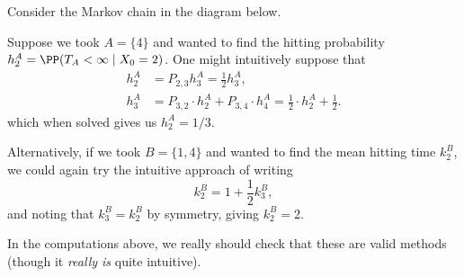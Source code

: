 \begin{example}
	Consider the Markov chain in the diagram below.
	\begin{center}
		\end{center}

		Suppose we took $A = \{4\}$ and wanted to find the hitting probability $h_2^A = \PP(T_A < \infty \mid X_0 = 2)$. One might intuitively suppose that
		\begin{align*}
			h_2^A &= P_{2, 3} h_3^A = \frac{1}{2} h_3^A, \\
			h_3^A &= P_{3, 2} \cdot h_2^A + P_{3, 4} \cdot h_4^A = \frac{1}{2} \cdot h_2^A + \frac{1}{2}.
		\end{align*}
		which when solved gives us $h_2^A = 1/3$.

		Alternatively, if we took $B = \{1, 4\}$ and wanted to find the mean hitting time $k_2^B$, we could again try the intuitive approach of writing
		$$
		k_2^B = 1 + \frac{1}{2}k_3^B,
		$$
		and noting that $k_3^B = k_2^B$ by symmetry, giving $k_2^B = 2$.
\end{example}

In the computations above, we really should check that these are valid methods (though it \emph{really is} quite intuitive).

